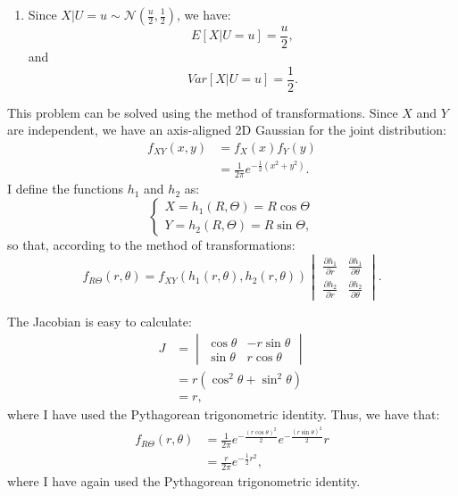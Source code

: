 \begin{problem}{28}
\begin{enumerate}
\item Since  $X|U=u \sim \mathcal N\left (\frac{u}{2}, \frac{1}{2} \right)$, we have:
\begin{equation*}
E[X|U=u] =\frac{u}{2},
\end{equation*}
and
\begin{equation*}
Var[X|U=u] =\frac{1}{2}.
\end{equation*}

\end{enumerate}
\end{problem}

\begin{problem}{29} This problem can be solved using the method of transformations.  Since $X$ and $Y$ are independent, we have an axis-aligned 2D Gaussian for the joint distribution:
\begin{align*}
f_{XY}(x,y) &= f_X(x)f_Y(y) \\
& = \frac{1}{ 2 \pi} e^{-\frac{1}{2}(x^2+y^2)}.
\end{align*}
I define the functions $h_1$ and $h_2$ as:
\[
\begin{cases}
               X = h_1(R, \Theta)= R\cos \Theta \\
	       Y = h_2(R, \Theta) = R\sin \Theta,
            \end{cases}
\]
so that, according to the method of transformations:
\begin{equation*}
f_{R\Theta}(r, \theta) = f_{XY}(h_1(r, \theta), h_2(r, \theta)) \begin{vmatrix}
\frac{\partial h_1}{\partial r} & \frac{\partial h_1}{\partial \theta}  \\ 
\frac{\partial h_2}{\partial r} & \frac{\partial h_2}{\partial \theta}
\end{vmatrix}.
\end{equation*}

The Jacobian is easy to calculate:
\begin{align*}
J &=  \begin{vmatrix}
\cos \theta & -r \sin \theta \\ 
\sin \theta & r\cos \theta 
\end{vmatrix}\\
& = r(\cos^2 \theta +\sin^2 \theta ) \\
& = r,
\end{align*}
where I have used the Pythagorean trigonometric identity.  Thus, we have that:
\begin{align*}
f_{R\Theta}(r, \theta) &= \frac{1}{2 \pi} e^{-\frac{(r \cos \theta)^2}{2}}e^{-\frac{(r \sin \theta)^2}{2}} r \\
&= \frac{r}{2 \pi} e^{-\frac{1}{2}r^2},
\end{align*}
where I have again used the Pythagorean trigonometric identity.


\end{problem}
